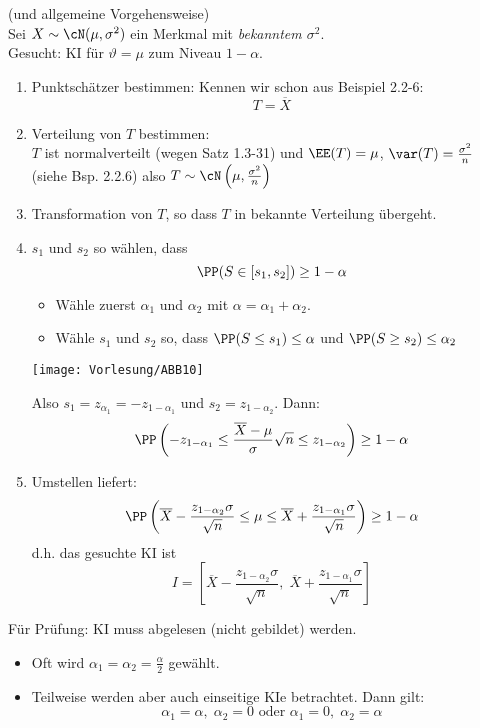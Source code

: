 \documentclass{scrreprt}
\begin{document}
 (und allgemeine Vorgehensweise)\\
Sei $X\sim \cN(\mu, \sigma^2)$ ein Merkmal mit \emph{bekanntem $\sigma^2$}.\\
Gesucht: KI für $\vartheta= \mu$ zum Niveau $1-\alpha$.
\begin{enumerate}
\item Punktschätzer bestimmen: Kennen wir schon aus Beispiel 2.2-6:
$$T=\overline{X}$$
\item Verteilung von $T$ bestimmen: \\
$T$ ist normalverteilt (wegen Satz 1.3-31) und $\EE(T) = \mu$, $\var (T) = \frac{\sigma^2}{n}$ (siehe Bsp. 2.2.6) also $T\sim \cN \left( \mu, \frac{\sigma^2}{n}\right)$
\item Transformation von $T$, so dass $T$ in bekannte Verteilung übergeht.
\item $s_1$ und $s_2$ so wählen, dass 
$$\PP(S \in [s_1, s_2]) \geq 1-\alpha$$
\begin{itemize}
\item Wähle zuerst $\alpha_1$ und $\alpha_2$ mit $\alpha = \alpha_1 + \alpha_2$.
\item Wähle $s_1$ und $s_2$ so, dass $\PP(S\leq s_1) \leq \alpha$ und $\PP(S\geq s_2) \leq \alpha_2$
\end{itemize}
\begin{center}
\texttt{[image: Vorlesung/ABB10]}
\end{center}
Also $s_1=z_{\alpha_1} = -z_{1-\alpha_1}$ und $s_2 = z_{1-\alpha_2}$. Dann:
$$\PP\left( - z_{1-\alpha_1} \leq \frac{\overline{X}-\mu}{\sigma}\sqrt{n} \leq z_{1-\alpha_2}\right) \geq 1-\alpha$$
\item Umstellen liefert:
$$\PP\left(\overline{X}-\frac{z_{1-\alpha_2}\sigma}{\sqrt{n}}\leq \mu \leq \overline{X} + \frac{z_{1-\alpha_1}\sigma}{\sqrt{n}}\right) \geq 1-\alpha$$
d.h. das gesuchte KI ist
$$I=\left[ \overline{X}-\frac{z_{1-\alpha_2}\sigma}{\sqrt{n}},\; \overline{X} + \frac{z_{1-\alpha_1}\sigma}{\sqrt{n}} \right]$$
\end{enumerate}

Für Prüfung: KI muss abgelesen (nicht gebildet) werden.

\begin{itemize}
\item Oft wird $\alpha_1=\alpha_2 = \frac{\alpha}{2}$ gewählt.
\item Teilweise werden aber auch einseitige KIe betrachtet. Dann gilt:
$$\alpha_1 = \alpha, \; \alpha_2 = 0 \text{ oder } \alpha_1 = 0 ,\; \alpha_2 = \alpha$$
\end{itemize}
\end{document}
